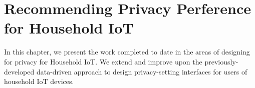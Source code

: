 \chapter{Recommending Privacy Perference for Household IoT}
In this chapter, we present the work completed to date in the areas of designing for privacy for Household IoT. We extend and improve upon the previously-developed data-driven approach to design privacy-setting interfaces for users of household IoT devices. 